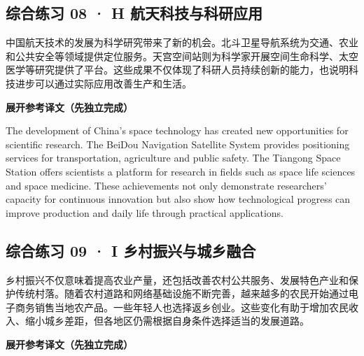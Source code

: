 \documentclass[a4paper,11pt,UTF8,fontset=none]{ctexart}
\begin{document}
\vspace{4pt}

\subsection{综合练习 08 · H 航天科技与科研应用}

\par

\noindent 中国航天技术的发展为科学研究带来了新的机会。北斗卫星导航系统为交通、农业和公共安全等领域提供定位服务。天宫空间站则为科学家开展空间生命科学、太空医学等研究提供了平台。这些成果不仅体现了科研人员持续创新的能力，也说明科技进步可以通过实际应用改善生产和生活。\par

\noindent\colorbox{HeadBlue}{\strut {\bfseries 展开参考译文（先独立完成）}}\par\vspace{1pt}

\noindent The development of China’s space technology has created new opportunities for scientific research. The BeiDou Navigation Satellite System provides positioning services for transportation, agriculture and public safety. The Tiangong Space Station offers scientists a platform for research in fields such as space life sciences and space medicine. These achievements not only demonstrate researchers’ capacity for continuous innovation but also show how technological progress can improve production and daily life through practical applications.\par

\vspace{4pt}

\subsection{综合练习 09 · I 乡村振兴与城乡融合}

\par

\noindent 乡村振兴不仅意味着提高农业产量，还包括改善农村公共服务、发展特色产业和保护传统村落。随着农村道路和网络基础设施不断完善，越来越多的农民开始通过电子商务销售当地农产品。一些年轻人也选择返乡创业。这些变化有助于增加农民收入、缩小城乡差距，但各地区仍需根据自身条件选择适当的发展道路。\par

\noindent\colorbox{HeadBlue}{\strut {\bfseries 展开参考译文（先独立完成）}}\par\vspace{1pt}
\end{document}
